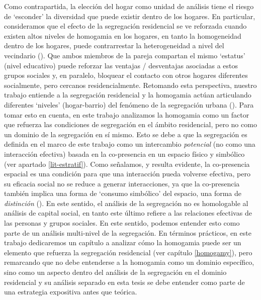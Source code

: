 \documentclass[
  spanish,
  a4paper,%
  chapterprefix=true,%
  DIV=calc,%
  twoside]{scrbook}%
\begin{document}
Como contrapartida, la elección del hogar como unidad de análisis tiene
el riesgo de `esconder' la diversidad que puede existir dentro de los
hogares. En particular, consideramos que el efecto de la segregación
residencial se ve reforzada cuando existen altos niveles de homogamia en
los hogares, en tanto la homogeneidad dentro de los hogares, puede
contrarrestar la heterogeneidad a nivel del vecindario ().
Que ambos miembros de la pareja compartan el mismo `estatus' (nivel
educativo) puede reforzar las ventajas / desventajas asociadas a estos
grupos sociales y, en paralelo, bloquear el contacto con otros hogares
diferentes socialmente, pero cercanos residencialmente. Retomando esta
perspectiva, nuestro trabajo entiende a la segregación residencial y la
homogamia actúan articulando diferentes `niveles' (hogar-barrio) del
fenómeno de la segregación urbana (). Para tomar esto en
cuenta, en este trabajo analizamos la homogamia como un factor que
refuerza las condiciones de segregación en el ámbito residencial, pero
no como un dominio de la segregación en sí mismo. Esto se debe a que la
segregación es definida en el marco de este trabajo como un intercambio
\emph{potencial} (no como una interacción efectiva) basada en la co-presencia
en un espacio físico y simbólico (ver apartado \ref{lit-estratif}).
Como señalamos, y resulta evidente, la co-presencia espacial es una
condición para que una interacción pueda volverse efectiva, pero su
eficacia social no se reduce a generar interacciones, ya que la
co-presencia también implica una forma de `consumo simbólico' del
espacio, una forma de \emph{distinción} (). En este sentido, el
análisis de la segregación no es homologable al análisis de capital
social, en tanto este último refiere a las relaciones efectivas de las
personas y grupos sociales. En este sentido, podemos entender esto como
parte de un análisis multi-nivel de la segregación. En términos
prácticos, en este trabajo dedicaremos un capítulo a analizar cómo la
homogamia puede ser un elemento que refuerza la segregación residencial
(ver capítulo \ref{homogamy}), pero remarcando que no debe entenderse a
la homogamia como un dominio específico, sino como un aspecto dentro del
análisis de la segregación en el dominio residencial y su análisis
separado en esta tesis se debe entender como parte de una estrategia
expositiva antes que teórica.
\end{document}
